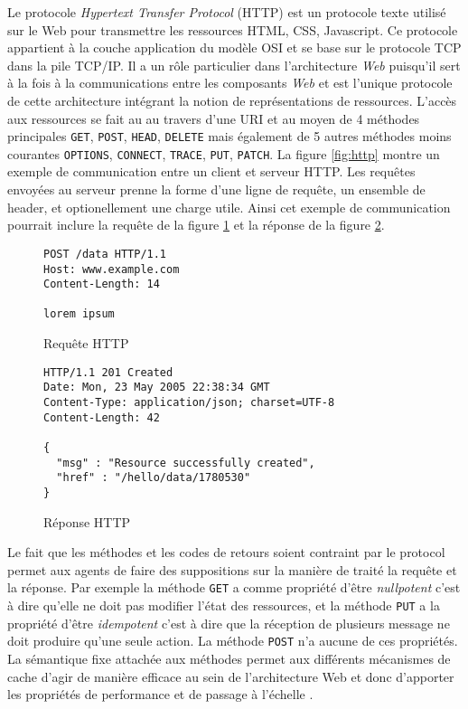 \documentclass[a4paper, 11pt]{report}
\begin{document}
Le protocole \emph{Hypertext Transfer Protocol} (HTTP) est un
protocole texte utilisé sur le Web pour transmettre les ressources
HTML, CSS, Javascript. Ce protocole appartient à la couche
application du modèle OSI et se base sur le protocole TCP dans la pile
TCP/IP. Il a un rôle particulier dans l'architecture \emph{Web}
puisqu'il sert à la fois à la communications entre les composants
\emph{Web} et est l'unique protocole de cette architecture intégrant
la notion de représentations de ressources. L'accès aux ressources se
fait au au travers d'une URI et au moyen de 4 méthodes principales
\verb=GET=, \verb=POST=, \verb=HEAD=, \verb=DELETE= mais également de
5 autres méthodes moins courantes \verb=OPTIONS=, \verb=CONNECT=,
\verb=TRACE=, \verb=PUT=, \verb=PATCH=. La figure \ref{fig:http}
montre un exemple de communication entre un client et serveur HTTP.
Les requêtes envoyées au serveur prenne la forme d'une ligne de
requête, un ensemble de header, et optionellement une charge utile.
Ainsi cet exemple de communication pourrait inclure la requête de la
figure \ref{fig:httpreq} et la réponse de la figure \ref{fig:httpres}.

\begin{figure}[h]
\begin{verbatim}
POST /data HTTP/1.1
Host: www.example.com
Content-Length: 14

lorem ipsum
\end{verbatim}
\caption{Requête HTTP}
\label{fig:httpreq}
\end{figure}

\begin{figure}[h]
\begin{verbatim}
HTTP/1.1 201 Created
Date: Mon, 23 May 2005 22:38:34 GMT
Content-Type: application/json; charset=UTF-8
Content-Length: 42

{
  "msg" : "Resource successfully created",
  "href" : "/hello/data/1780530"
}
\end{verbatim}
\caption{Réponse HTTP}
\label{fig:httpres}
\end{figure}

Le fait que les méthodes et les codes de retours soient contraint par
le protocol permet aux agents de faire des suppositions sur la manière
de traité la requête et la réponse. Par exemple la méthode \verb=GET=
a comme propriété d'être \emph{nullpotent} c'est à dire qu'elle ne
doit pas modifier l'état des ressources, et la méthode \verb=PUT= a la
propriété d'être \emph{idempotent} c'est à dire que la réception de
plusieurs message ne doit produire qu'une seule action. La méthode
\verb=POST= n'a aucune de ces propriétés. La sémantique fixe attachée
aux méthodes permet aux différents mécanismes de cache d'agir de
manière efficace au sein de l'architecture Web et donc d'apporter les
propriétés de performance et de passage à l'échelle
\cite{fielding1999hypertext}.
\end{document}
